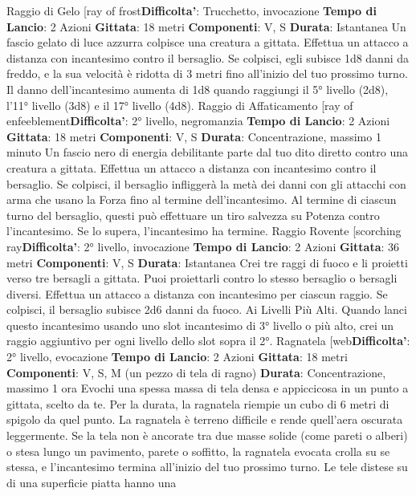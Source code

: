 \begin{multicols}{2}
Raggio di Gelo
[ray of frost\textbf{Difficolta'}:
Trucchetto, invocazione
\textbf{Tempo di Lancio}: 2 Azioni
\textbf{Gittata}: 18 metri
\textbf{Componenti}: V, S
\textbf{Durata}: Istantanea
Un fascio gelato di luce azzurra colpisce una creatura a
gittata. Effettua un attacco a distanza con incantesimo
contro il bersaglio. Se colpisci, egli subisce 1d8 danni
da freddo, e la sua velocità è ridotta di 3 metri fino
all’inizio del tuo prossimo turno.
Il danno dell’incantesimo aumenta di 1d8 quando
raggiungi il 5° livello (2d8), l’11° livello (3d8) e il 17°
livello (4d8).
Raggio di Affaticamento
[ray of enfeeblement\textbf{Difficolta'}:
2° livello, negromanzia
\textbf{Tempo di Lancio}: 2 Azioni
\textbf{Gittata}: 18 metri
\textbf{Componenti}: V, S
\textbf{Durata}: Concentrazione, massimo 1 minuto
Un fascio nero di energia debilitante parte dal tuo dito
diretto contro una creatura a gittata. Effettua un attacco
a distanza con incantesimo contro il bersaglio. Se
colpisci, il bersaglio infliggerà la metà dei danni con gli
attacchi con arma che usano la Forza fino al termine
dell’incantesimo.
Al termine di ciascun turno del bersaglio, questi può
effettuare un tiro salvezza su Potenza contro
l’incantesimo. Se lo supera, l’incantesimo ha termine.
Raggio Rovente
[scorching ray\textbf{Difficolta'}:
2° livello, invocazione
\textbf{Tempo di Lancio}: 2 Azioni
\textbf{Gittata}: 36 metri
\textbf{Componenti}: V, S
\textbf{Durata}: Istantanea
Crei tre raggi di fuoco e li proietti verso tre bersagli a
gittata. Puoi proiettarli contro lo stesso bersaglio o
bersagli diversi.
Effettua un attacco a distanza con incantesimo per
ciascun raggio. Se colpisci, il bersaglio subisce 2d6
danni da fuoco.
Ai Livelli Più Alti. Quando lanci questo incantesimo
usando uno slot incantesimo di 3° livello o più alto, crei
un raggio aggiuntivo per ogni livello dello slot sopra il
2°.
Ragnatela
[web\textbf{Difficolta'}:
2° livello, evocazione
\textbf{Tempo di Lancio}: 2 Azioni
\textbf{Gittata}: 18 metri
\textbf{Componenti}: V, S, M (un pezzo di tela di ragno)
\textbf{Durata}: Concentrazione, massimo 1 ora
Evochi una spessa massa di tela densa e appiccicosa
in un punto a gittata, scelto da te. Per la durata, la
ragnatela riempie un cubo di 6 metri di spigolo da quel
punto. La ragnatela è terreno difficile e rende quell’aera
oscurata leggermente.
Se la tela non è ancorate tra due masse solide (come
pareti o alberi) o stesa lungo un pavimento, parete o
soffitto, la ragnatela evocata crolla su se stessa, e
l’incantesimo termina all’inizio del tuo prossimo turno.
Le tele distese su di una superficie piatta hanno una

\end{multicols}
